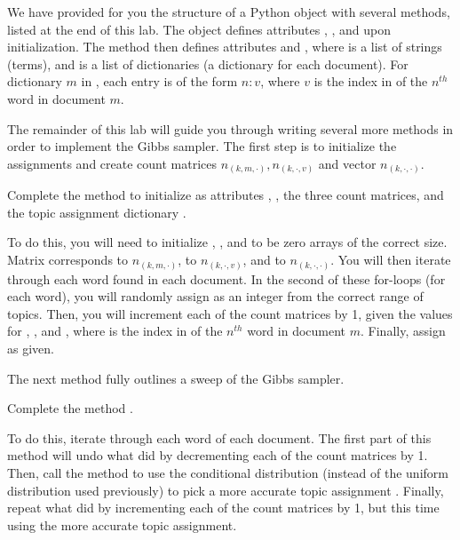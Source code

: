 We have provided for you the structure of a Python object  with several methods, listed at the end of this lab.
The object defines attributes , , and  upon initialization.
The method  then defines attributes  and , where  is a list of strings (terms), and  is a list of dictionaries (a dictionary for each document). 
For dictionary $m$ in , each entry is of the form $n : v$, where $v$ is the index in  of the $n^{th}$ word in document $m$.

The remainder of this lab will guide you through writing several more methods in order to implement the Gibbs sampler. 
The first step is to initialize the assignments and create count matrices $n_{(k,m,\cdot)}, n_{(k,\cdot,v)}$ and vector $n_{(k,\cdot,\cdot)}$.

\begin{problem}
Complete the method  to initialize as attributes , , the three count matrices, and the topic assignment dictionary .

To do this, you will need to initialize , , and  to be zero arrays of the correct size.
Matrix  corresponds to $n_{(k,m,\cdot)}$,  to $n_{(k,\cdot,v)}$, and  to $n_{(k,\cdot,\cdot)}$.
You will then iterate through each word found in each document.
In the second of these for-loops (for each word), you will randomly assign  as an integer from the correct range of topics.
Then, you will increment each of the count matrices by 1, given the values for , , and , where  is the index in  of the $n^{th}$ word in document $m$.
Finally, assign  as given.
\end{problem}

The next method fully outlines a sweep of the Gibbs sampler.

\begin{problem}
Complete the method . 

To do this, iterate through each word of each document. 
The first part of this method will undo what  did by decrementing each of the count matrices by 1.
Then, call the method  to use the conditional distribution (instead of the uniform distribution used previously) to pick a more accurate topic assignment .
Finally, repeat what  did by incrementing each of the count matrices by 1, but this time using the more accurate topic assignment.
\end{problem}

